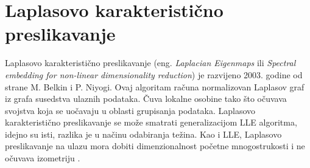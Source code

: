 \chapter{Laplasovo karakteristi\v cno preslikavanje}
Laplasovo karakteristi\v cno preslikavanje (eng. {\it\textenglish{Laplacian Eigenmaps}} ili {\it\textenglish{Spectral embedding for non-linear dimensionality reduction}}) je razvijeno 2003. godine od strane \textenglish{M. Belkin} i \textenglish{P. Niyogi}. Ovaj algoritam ra\v cuna normalizovan Laplasov graf iz grafa susedstva ulaznih podataka. \v Cuva lokalne osobine tako \v sto o\v cuvava svojstva koja se uo\v cavaju u oblasti grupisanja podataka. Laplasovo karakteristi\v cno preslikavanje se mo\v ze smatrati generalizacijom \textenglish{LLE} algoritma, idejno su isti, razlika je u na\v cinu odabiranja te\v zina. Kao i \textenglish{LLE}, Laplasovo preslikavanje na ulazu mora dobiti dimenzionalnost po\v cetne mnogostrukosti i ne o\v cuvava izometriju \cite{kratkoOSVakomAlg, leigUvod}.


